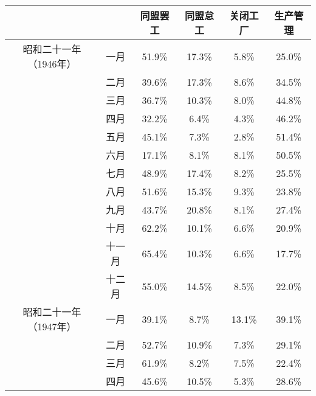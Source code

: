 \documentclass[a4paper,12pt]{article}
\begin{document}
\begin{table}
  \begin{tabular}{|c|c|c|c|c|c|}
    \hline
                           &      & 同盟罢工 & 同盟怠工 & 关闭工厂 & 生产管理 \\ 
    \hline
    昭和二十一年（1946年） & 一月 & 51.9\%   & 17.3\%   &  5.8\%   & 25.0\%   \\ 
    \hline
                           & 二月 & 39.6\%   & 17.3\%   &  8.6\%   & 34.5\%   \\ 
    \hline
                           & 三月 & 36.7\%   & 10.3\%   &  8.0\%   & 44.8\%   \\ 
    \hline
                           & 四月 & 32.2\%   &  6.4\%   &  4.3\%   & 46.2\%   \\ 
    \hline                                                                        
                           & 五月 & 45.1\%   &  7.3\%   &  2.8\%   & 51.4\%   \\ 
    \hline                                                                        
                           & 六月 & 17.1\%   &  8.1\%   &  8.1\%   & 50.5\%   \\ 
    \hline                                                                        
                           & 七月 & 48.9\%   & 17.4\%   &  8.2\%   & 25.5\%   \\ 
    \hline                                                                        
                           & 八月 & 51.6\%   & 15.3\%   &  9.3\%   & 23.8\%   \\ 
    \hline
                           & 九月 & 43.7\%   & 20.8\%   &  8.1\%   & 27.4\%   \\ 
    \hline
                           & 十月 & 62.2\%   & 10.1\%   &  6.6\%   & 20.9\%   \\ 
    \hline
                         & 十一月 & 65.4\%   & 10.3\%   &  6.6\%   & 17.7\%   \\ 
    \hline
                         & 十二月 & 55.0\%   & 14.5\%   &  8.5\%   & 22.0\%   \\ 
    \hline
    昭和二十一年（1947年） & 一月 & 39.1\%   &  8.7\%   & 13.1\%   & 39.1\%   \\ 
    \hline
                           & 二月 & 52.7\%   & 10.9\%   &  7.3\%   & 29.1\%   \\ 
    \hline
                           & 三月 & 61.9\%   &  8.2\%   &  7.5\%   & 22.4\%   \\ 
    \hline
                           & 四月 & 45.6\%   & 10.5\%   &  5.3\%   & 28.6\%   \\ 

\end{tabular}
\end{table}
\end{document}
